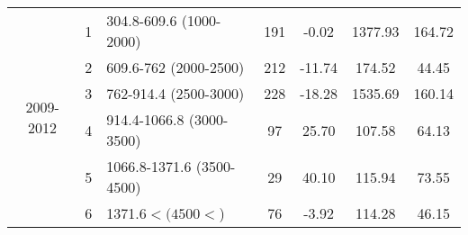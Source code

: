 \begin{table}[htbp]
\begin{tabular}{rrlcccc}
    \multicolumn{1}{c}{\multirow{6}[2]{*}{\begin{sideways}2009-2012\end{sideways}}} & \multicolumn{1}{c}{1} & \multicolumn{1}{l}{304.8-609.6 (1000-2000)} & 191   & -0.02  & 1377.93  & 164.72  \\
    \multicolumn{1}{c}{} & \multicolumn{1}{c}{2} & \multicolumn{1}{l}{609.6-762 (2000-2500)} & 212   & -11.74  & 174.52  & 44.45  \\
    \multicolumn{1}{c}{} & \multicolumn{1}{c}{3} & \multicolumn{1}{l}{762-914.4 (2500-3000)} & 228   & -18.28  & 1535.69  & 160.14  \\
    \multicolumn{1}{c}{} & \multicolumn{1}{c}{4} & \multicolumn{1}{l}{914.4-1066.8 (3000-3500)} & 97    & 25.70  & 107.58  & 64.13  \\
    \multicolumn{1}{c}{} & \multicolumn{1}{c}{5} & \multicolumn{1}{l}{1066.8-1371.6 (3500-4500)} & 29    & 40.10  & 115.94  & 73.55  \\
    \multicolumn{1}{c}{} & \multicolumn{1}{c}{6} & \multicolumn{1}{l}{1371.6$< (4500<$)} & 76    & -3.92  & 114.28  & 46.15  \\
    \bottomrule
    \end{tabular}%
  \label{tab:DSANC}%
\end{table}%
